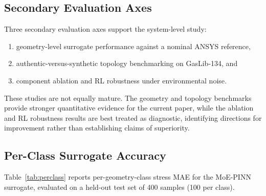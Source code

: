 \documentclass[conference]{IEEEtran}
\begin{document}
\subsection{Secondary Evaluation Axes}

Three secondary evaluation axes support the system-level study:

\begin{enumerate}

\item geometry-level surrogate performance against a nominal ANSYS reference,

\item authentic-versus-synthetic topology benchmarking on GasLib-134, and

\item component ablation and RL robustness under environmental noise.

\end{enumerate}

These studies are not equally mature. The geometry and topology benchmarks provide stronger quantitative evidence for the current paper, while the ablation and RL robustness results are best treated as diagnostic, identifying directions for improvement rather than establishing claims of superiority.
 
\subsection{Per-Class Surrogate Accuracy}

Table~\ref{tab:perclass} reports per-geometry-class stress MAE for the MoE-PINN surrogate, evaluated on a held-out test set of 400 samples (100 per class).










\end{document}
